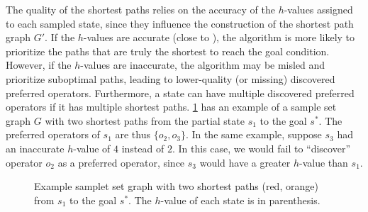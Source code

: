 \documentclass[ppgc,diss,english]{iiufrgs}
\begin{document}
The quality of the shortest paths relies on the accuracy of the $h$-values assigned to each sampled state, since they influence the construction of the shortest path graph $G'$. If the $h$-values are accurate (close to \hstar), the algorithm is more likely to prioritize the paths that are truly the shortest to reach the goal condition. However, if the $h$-values are inaccurate, the algorithm may be misled and prioritize suboptimal paths, leading to lower-quality (or missing) discovered preferred operators.
Furthermore, a state can have multiple discovered preferred operators if it has multiple shortest paths. \cref{fig:spg-example} has an example of a sample set graph $G$ with two shortest paths from the partial state $s_{1}$ to the goal $s^{*}$. The preferred operators of $s_{1}$ are thus $\{o_{2}, o_{3}\}$. In the same example, suppose $s_{3}$ had an inaccurate $h$-value of $4$ instead of $2$. In this case, we would fail to ``discover'' operator $o_{2}$ as a preferred operator, since $s_{3}$ would have a greater $h$-value than $s_{1}$.

\begin{figure}[htb]
\caption[Example sample set graph with two shortest paths]{Example samplet set graph with two shortest paths (red, orange) from $s_{1}$ to the goal $s^{*}$. The $h$-value of each state is in parenthesis.}
\centering
{}
\label{fig:spg-example}
\end{figure}
\end{document}
